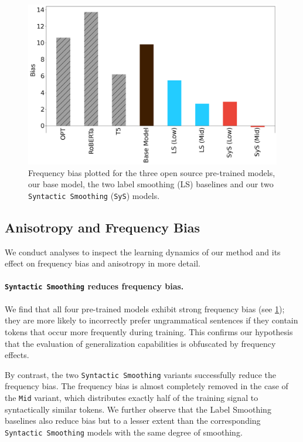 \begin{figure}[ht!]
    \centering
    \includegraphics[width=0.7\linewidth]{chapters/syntatic-smoothing/figures/biases.png}
    \caption{Frequency bias plotted for the three open source pre-trained models, our base model, the two label smoothing (LS) baselines and our two \texttt{Syntactic Smoothing} (\texttt{SyS}) models.}
    \label{fig:biases}
    \vspace{-1em}
\end{figure}

\subsection{Anisotropy and Frequency Bias}
We conduct analyses to inspect the learning dynamics of our method and its effect on frequency bias and anisotropy in more detail. 

\paragraph{\texttt{Syntactic Smoothing} reduces frequency bias.}
We find that all four pre-trained models exhibit strong frequency bias (see \cref{fig:biases}); they are more likely to incorrectly prefer ungrammatical sentences if they contain tokens that occur more frequently during training. This confirms our hypothesis that the evaluation of generalization capabilities is obfuscated by frequency effects. 

By contrast, the two \texttt{Syntactic Smoothing} variants successfully reduce the frequency bias. The frequency bias is almost completely removed in the case of the \texttt{Mid} variant, which distributes exactly half of the training signal to syntactically similar tokens. We further observe that the Label Smoothing baselines also reduce bias but to a lesser extent than the corresponding \texttt{Syntactic Smoothing} models with the same degree of smoothing. 

